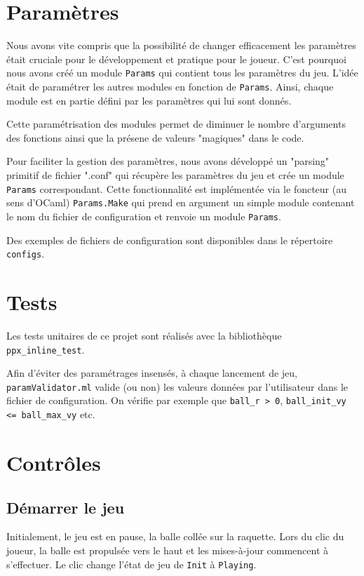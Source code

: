 \documentclass[french]{template}
\begin{document}
\section{Paramètres}

Nous avons vite compris que la possibilité de changer efficacement les paramètres était cruciale pour le développement et pratique pour le joueur. C'est pourquoi nous avons créé un module \texttt{Params} qui contient tous les paramètres du jeu. L'idée était de paramétrer les autres modules en fonction de \texttt{Params}. Ainsi, chaque module est en partie défini par les paramètres qui lui sont donnés.

Cette paramétrisation des modules permet de diminuer le nombre d'arguments des fonctions ainsi que la présene de valeurs "magiques" dans le code.

Pour faciliter la gestion des paramètres, nous avons développé un "parsing" primitif de fichier ".conf" qui récupère les paramètres du jeu et crée un module \texttt{Params} correspondant. Cette fonctionnalité est implémentée via le foncteur (au sens d'OCaml) \texttt{Params.Make} qui prend en argument un simple module contenant le nom du fichier de configuration et renvoie un module \texttt{Params}.

Des exemples de fichiers de configuration sont disponibles dans le répertoire \texttt{configs}.

\section{Tests}

Les tests unitaires de ce projet sont réalisés avec la bibliothèque \texttt{ppx\_inline\_test}.

Afin d'éviter des paramétrages insensés, à chaque lancement de jeu, \texttt{paramValidator.ml} valide (ou non) les valeurs données par l'utilisateur dans le fichier de configuration. On vérifie par exemple que \texttt{ball\_r > 0}, \texttt{ball\_init\_vy <= ball\_max\_vy} etc.

\section{Contrôles}

\subsection{Démarrer le jeu}

Initialement, le jeu est en pause, la balle collée sur la raquette. Lors du clic du joueur, la balle est propulsée vers le haut et les mises-à-jour commencent à s'effectuer. Le clic change l'état de jeu de \texttt{Init} à \texttt{Playing}.
\end{document}
